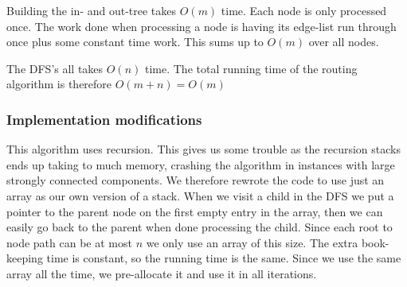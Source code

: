 Building the in- and out-tree takes $O(m)$ time. Each node is only processed once. The work done when processing a node is having its edge-list run
through once plus some constant time work. This sums up to $O(m)$ over all nodes.

The DFS's all takes $O(n)$ time. The total running time of the routing algorithm is therefore $O(m+n) = O(m)$

\subsubsection{Implementation modifications}
This algorithm uses recursion. This gives us some trouble as the recursion stacks ends up taking to much memory, crashing the algorithm in 
instances with large strongly connected components. 
We therefore rewrote the code to use just an array as our own version of a stack.
When we visit a child in the DFS we put a pointer to the parent node on the first empty entry in the array, then we can easily go back to the 
parent when done processing the child. Since each root to node path can be at most $n$ we only use an array of this size.
The extra book-keeping time is constant, so the running time is the same. Since we use the same array all the time, we pre-allocate it
and use it in all iterations.